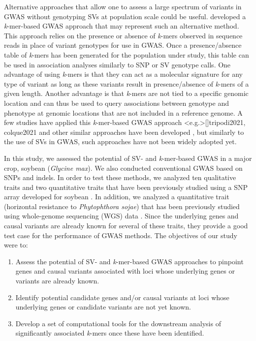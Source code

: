\documentclass{article}
\begin{document}
Alternative approaches that allow one to assess a large spectrum
of variants in GWAS without genotyping SVs at population scale could be useful.
 developed a \emph{k}-mer-based GWAS approach that may
represent such an alternative method. This approach relies on the presence or
absence of \emph{k}-mers observed in sequence reads in place of variant genotypes for use in
GWAS. Once a presence/absence table of \emph{k}-mers has been generated for the
population under study, this table can be used in association analyses
similarly to SNP or SV genotype calls. One advantage of using \emph{k}-mers is
that they can act as a molecular signature for any type of variant as long as
these variants result in presence/absence of \emph{k}-mers of a given length.
Another advantage is that \emph{k}-mers are not tied to a specific genomic
location and can thus be used to query associations between genotype and
phenotype at genomic locations that are not included in a reference genome.  A
few studies have applied this \emph{k}-mer-based GWAS approach
\shortcite<e.g.>[]{tripodi2021, colque2021} and other similar approaches have been
developed , but similarly to the use of SVs in GWAS,
such approaches have not been widely adopted yet.

In this study, we assessed the potential of SV- and \emph{k}-mer-based GWAS in
a major crop, soybean (\emph{Glycine max}). We also conducted conventional GWAS
based on SNPs and indels. In order to test these methods, we analyzed ten
qualitative traits  and two quantitative traits
 that have been previously studied using a SNP array
developed for soybean . In addition, we analyzed a quantitative
trait (horizontal resistance to \emph{Phytophthora sojae}) that has been
previously studied using whole-genome sequencing (WGS) data
.  Since the underlying genes and causal variants are
already known for several of these traits, they provide a good test case for
the performance of GWAS methods.  The objectives of our study were to:

\begin{enumerate}
	\item Assess the potential of SV- and \emph{k}-mer-based GWAS approaches to
		pinpoint genes and causal variants associated with loci whose
		underlying genes or variants are already known.
	\item Identify potential candidate genes and/or causal variants at loci
		whose underlying genes or candidate variants are not yet known.
	\item Develop a set of computational tools for the downstream analysis
		of significantly associated \emph{k}-mers once these have been
		identified.
\end{enumerate}
\end{document}
